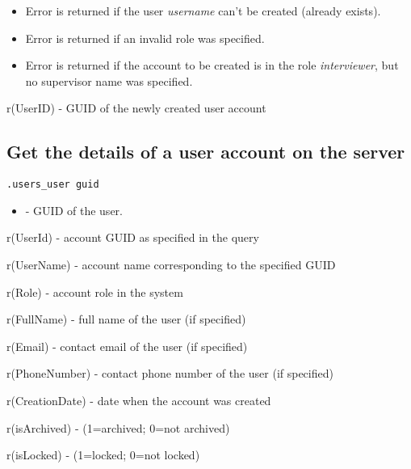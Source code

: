 \errheader
\begin{itemize}
    \item Error  is returned if the user \textit{username} can't be created (already exists).
    \item Error  is returned if an invalid role was specified.
    \item Error  is returned if the account to be created is in the role \textit{interviewer}, but no supervisor name was specified.
\end{itemize}

\savedres
\begin{compactitem}
    \item r(UserID) - GUID of the newly created user account
\end{compactitem}

\subsection{Get the details of a user account on the server}
\begin{lstlisting}[style=CommandLineStyle]
.users_user guid
\end{lstlisting}

\paramsheader
\begin{itemize}
    \item {} - GUID of the user.
\end{itemize}

\savedres
\begin{compactitem}
    \item r(UserId) - account GUID as specified in the query
    \item r(UserName) - account name corresponding to the specified GUID
    \item r(Role) - account role in the system
    \item r(FullName) - full name of the user (if specified)
    \item r(Email) - contact email of the user (if specified)
    \item r(PhoneNumber) - contact phone number of the user (if specified)
    \item r(CreationDate) - date when the account was created
    \item r(isArchived) - (1=archived; 0=not archived)
    \item r(isLocked) - (1=locked; 0=not locked)
\end{compactitem}

